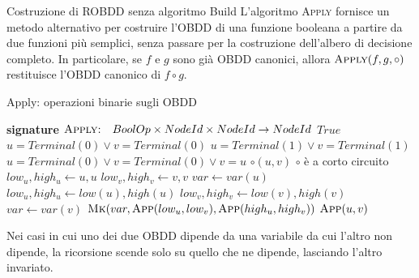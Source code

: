 \begin{note}{Costruzione di ROBDD senza algoritmo Build}
  L'algoritmo \textsc{Apply} fornisce un metodo alternativo per costruire l'OBDD di una funzione booleana a partire da due funzioni più semplici, senza passare per la costruzione dell'albero di decisione completo. In particolare, se \(f\) e \(g\) sono già OBDD canonici, allora \(\textsc{Apply}(f,g,\circ)\) restituisce l'OBDD canonico di \(f \circ g\).
\end{note}


\begin{algorithmdesc}{Apply: operazioni binarie sugli OBDD}
  \begin{algorithmic}[1]
    \Statex{} \textbf{signature} \(\textsc{Apply:} \quad BoolOp \times NodeId \times NodeId \to NodeId\)
          \State{} \Return{} \(True\)
        \EndIf{}
        \If{\(\circ = \land\)}
          \State{} \Return{} \(u = Terminal(0) \lor v = Terminal(0)\)
        \ElsIf{\(\circ = \lor\)}
          \State{} \Return{} \(u = Terminal(1) \lor v = Terminal(1)\)
        \ElsIf{\(\circ = \oplus\)}
          \State{} \Return{} \(u = Terminal(0) \lor v = Terminal(0) \lor v=u\)
        \EndIf{}
      \EndFunction{}
          \State{} \Return{} \(\circ(u,v)\) \Comment{} \(\circ\) è a corto circuito
        \EndIf{}
        \State{} \(low_u, high_u \gets u,u\)
        \State{} \(low_v, high_v \gets v,v\)
        \State{} \(var \gets var(u)\)
          \State{} \(low_u, high_u \gets low(u), high(u)\)
        \EndIf{}
          \State{} \(low_v, high_v \gets low(v), high(v)\)
          \State{} \(var \gets var(v)\)
        \EndIf{}
        \State{} \Return{} \(\textsc{Mk}(var, \textsc{App}(low_u, low_v), \textsc{App}(high_u, high_v))\)
      \EndFunction{}
      \State{} \Return{} \(\textsc{App}(u,v)\)
    \EndFunction{}
  \end{algorithmic}
  
\end{algorithmdesc}


\begin{note}{}
  Nei casi in cui uno dei due OBDD dipende da una variabile da cui l'altro non dipende, la ricorsione scende solo su quello che ne dipende, lasciando l'altro invariato.
\end{note}

